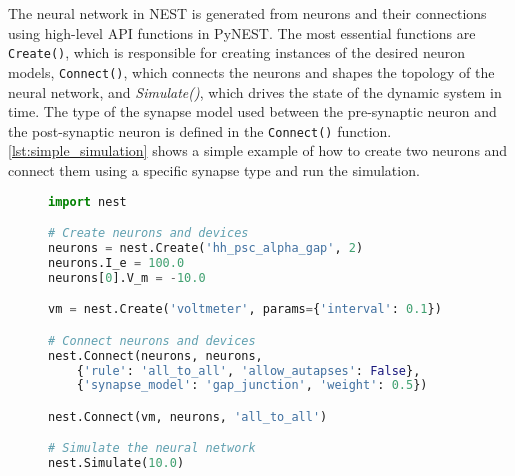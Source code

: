 The neural network in NEST is generated from neurons and their connections using high-level API functions in PyNEST. The most essential functions are \texttt{Create()}, which is responsible for creating instances of the desired neuron models, \texttt{Connect()}, which connects the neurons and shapes the topology of the neural network, and \emph{Simulate()}, which drives the state of the dynamic system in time. The type of the synapse model used between the pre-synaptic neuron and the post-synaptic neuron is defined in the \texttt{Connect()} function. \autoref{lst:simple_simulation} shows a simple example of how to create two neurons and connect them using a specific synapse type and run the simulation.\\

\begin{figure}[ht!]
  \centering
\begin{lstlisting}[language=Python, label=lst:simple_simulation, caption={Every simulation script using PyNEST starts with importing the \texttt{nest} module in Python. In line 4, we create two Hodgkin-Huxley neurons as instances of the \emph{hh\_psc\_alpha\_gap} model. In line 5, we set a background current of 100.0 pA for both neurons. Line 6 modifies the initial membrane potentials of the first neuron instance to be at -10.0 mV. In line 8, we create a \texttt{voltmeter} to record the membrane potential of both neurons. In line 11, we connect the first neuron with the second neuron, and vice-versa using the \emph{gap\_junction} synapse model. Finally, we connect the voltmeter to the neurons to record their membrane potential over the course of the simulation in line 15 and run the simulation for 10.0 milliseconds in the last line by calling the \texttt{Simulate()} function.}, captionpos=b]
import nest

# Create neurons and devices
neurons = nest.Create('hh_psc_alpha_gap', 2)
neurons.I_e = 100.0
neurons[0].V_m = -10.0

vm = nest.Create('voltmeter', params={'interval': 0.1})

# Connect neurons and devices
nest.Connect(neurons, neurons,
    {'rule': 'all_to_all', 'allow_autapses': False},
    {'synapse_model': 'gap_junction', 'weight': 0.5})

nest.Connect(vm, neurons, 'all_to_all')

# Simulate the neural network
nest.Simulate(10.0)
\end{lstlisting}
\end{figure}


